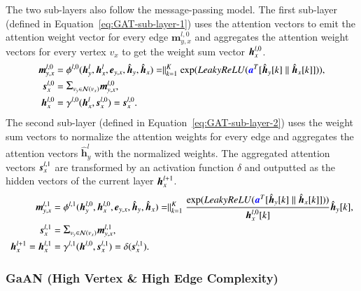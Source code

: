The two sub-layers also follow the message-passing model.
The first sub-layer (defined in Equation~\ref{eq:GAT-sub-layer-1}) uses the attention vectors to emit the attention weight vector for every edge $\boldsymbol{m}^{l,0}_{y,x}$ and aggregates the attention weight vectors for every vertex $v_x$ to get the weight sum vector $\boldsymbol{h}^{l,0}_x$.
%
\begin{equation}
    \label{eq:GAT-sub-layer-1}
    \begin{aligned}
        \MyVec{m}^{l,0}_{y,x} & = \phi^{l,0}(\MyVec{h}^l_y, \MyVec{h}^l_x, \MyVec{e}_{y,x}, \hvec{y}, \hvec{x}) = \parallel_{k=1}^{K}\GATCalcWeight, \\
        \MyVec{s}^{l,0}_{x} &= \mathlarger{\Sigma}_{v_y \in \mathcal{N}(v_x)}{\MyVec{m}^{l,0}_{y,x}}, \\
        \MyVec{h}^{l,0}_{x} &= \gamma^{l,0}(\MyVec{h}^l_x, \MyVec{s}^{l,0}_{x})  = \MyVec{s}^{l,0}_{x}.
    \end{aligned}
\end{equation}
%
The second sub-layer (defined in Equation~\ref{eq:GAT-sub-layer-2}) uses the weight sum vectors to normalize the attention weights for every edge and aggregates the attention vectors $\boldsymbol{\hat{h}}^l_y$ with the normalized weights.
%
The aggregated attention vectors $\boldsymbol{s}^{l,1}_x$ are transformed by an activation function $\delta$ and outputted as the hidden vectors of the current layer $\boldsymbol{h}^{l+1}_x$.
%
\begin{equation}
        \label{eq:GAT-sub-layer-2}
    \begin{aligned}
        \MyVec{m}^{l,1}_{y,x} &= \phi^{l,1}(\MyVec{h}^{l,0}_y, \MyVec{h}^{l,0}_x, \MyVec{e}_{y,x}, \hvec{y}, \hvec{x}) = \parallel_{k=1}^{K}\frac{\GATCalcWeight}{\MyVec{h}^{l,0}_x[k]}\hvec{y}[k], \\
        \MyVec{s}^{l,1}_x &= \mathlarger{\Sigma}_{v_y \in \mathcal{N}(v_x)} \MyVec{m}^{l,1}_{y,x}, \\
        \MyVec{h}^{l+1}_x = \MyVec{h}^{l,1}_x &= \gamma^{l,1}(\MyVec{h}^{l,0}, \MyVec{s}^{l,1}_x) = \delta(\MyVec{s}^{l,1}_x).
    \end{aligned}
\end{equation}

\subsubsection{GaAN (High Vertex \& High Edge Complexity)}

